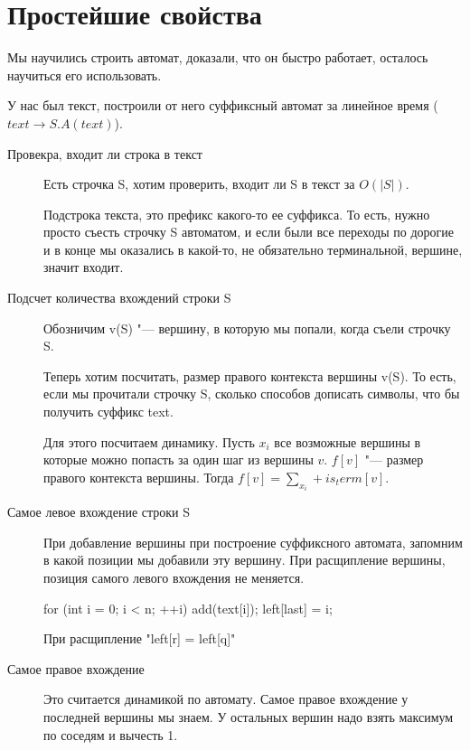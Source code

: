 ﻿\date{September 22, 2016}
\author{Chernikova Olga}

\section{Простейшие свойства}
Мы научились строить автомат, доказали, что он быстро работает, осталось 
научиться его использовать.%

У нас был текст, построили от него суффиксный автомат за линейное время ($text \to S.A(text)$). 

\begin{description}
\item[Провекра, входит ли строка в текст]
    Есть строчка S, хотим проверить, входит ли S в текст за $O(|S|)$.

    Подстрока текста, это префикс какого-то ее суффикса. То есть, нужно просто 
    съесть строчку S автоматом, и если были все переходы по дорогие и в конце мы 
    оказались в какой-то, не обязательно терминальной, вершине, значит входит.

\item[Подсчет количества вхождений строки S]
    
    Обозничим v(S) "--- вершину, в которую мы попали, когда съели строчку S.

    Теперь хотим посчитать, размер правого контекста вершины v(S). То есть, 
    если мы прочитали строчку S, сколько способов дописать символы, что бы 
    получить суффикс text. 

    Для этого посчитаем динамику. Пусть $x_i$ все возможные вершины в которые 
    можно попасть за один шаг из вершины $v$. $f[v]$ "--- размер правого контекста вершины. 
    Тогда $f[v] = \sum_{x_i} + is_term[v]$.
\item[Самое левое вхождение строки S]
    При добавление вершины при построение суффиксного автомата,
    запомним в какой позиции мы добавили эту вершину. При расщипление
    вершины, позиция самого левого вхождения не меняется.

    \begin{cppcode}
    for (int i = 0; i < n; ++i) {
        add(text[i]);
        left[last] = i;
    }
    \end{cppcode}

    При расщипление \cpp"left[r] = left[q]"
\item[Самое правое вхождение]
    Это считается динамикой по автомату. Самое правое вхождение у
    последней вершины мы знаем. У остальных вершин надо взять максимум по соседям и вычесть 1. 
\end{description}


